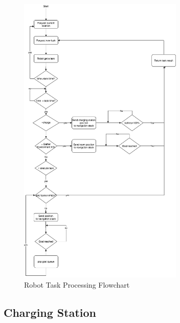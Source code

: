 \begin{figure}[htbp]
    \centering
    \includegraphics[width = 0.7\textwidth]{content/images/ch4/robot_task_flow.drawio.png}
    \caption{Robot Task Processing Flowchart}
    \label{fig:robot_task_processing}
\end{figure}






\subsection{Charging Station}
\label{sec:charging_station}
